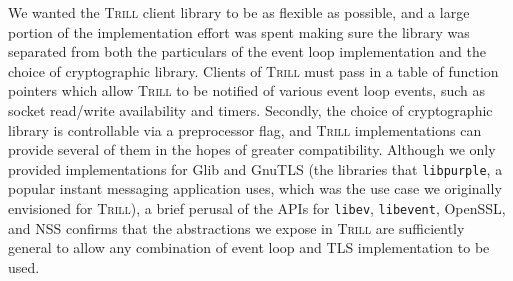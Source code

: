 \documentclass[11pt]{article}
\newcommand{\Trill}{\textsc{Trill}\xspace}
\begin{document}
We wanted the \Trill client library to be as flexible as possible, and a large
portion of the implementation effort was spent making sure the library was
separated from both the particulars of the event loop implementation and the
choice of cryptographic library. Clients of \Trill must pass in a table of
function pointers which allow \Trill to be notified of various event loop
events, such as socket read/write availability and timers.  Secondly, the choice
of cryptographic library is controllable via a preprocessor flag, and \Trill
implementations can provide several of them in the hopes of greater
compatibility. Although we only provided implementations for Glib and GnuTLS
(the libraries that \verb`libpurple`, a popular instant messaging application
uses, which was the use case we originally envisioned for \Trill), a brief
perusal of the APIs for \verb`libev`, \verb`libevent`, OpenSSL, and NSS confirms
that the abstractions we expose in \Trill are sufficiently general to allow any
combination of event loop and TLS implementation to be used.
\end{document}
